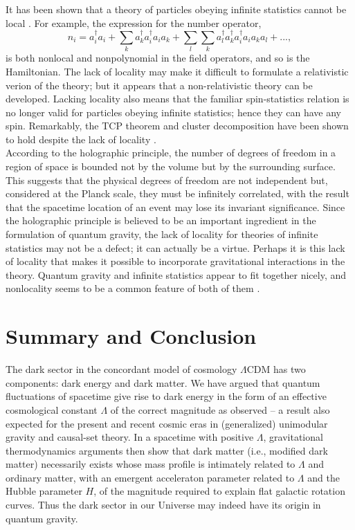\documentclass[a4paper]{jpconf}
\begin{document}
It has been shown that a theory of particles
obeying infinite statistics cannot be local \cite{fredenhagen,
greenberg}.  For example, the expression for the number operator,
\begin{equation}
n_i = a_i^{\dagger} a_i + \sum_k a_k^{\dagger} a_i^{\dagger} a_i a_k 
+ \sum_l \sum_k a_l^{\dagger} a_k^{\dagger} a_i^{\dagger} a_i a_k a_l + ...,
\label{number}
\end{equation}
is both nonlocal and nonpolynomial in the field operators,
and so is the Hamiltonian.  The lack of
locality may make it difficult to formulate a relativistic verion of the
theory; but it appears that a non-relativistic theory can be developed.
Lacking locality also means that the familiar spin-statistics relation is no
longer valid for particles obeying infinite statistics; hence
they can have any spin.  Remarkably, the TCP theorem and cluster
decomposition have been shown to hold despite the lack of locality
\cite{greenberg}.\\

According to the holographic principle, the
number of degrees of freedom in a region of space is bounded not by
the volume but by the surrounding surface.  This suggests that the
physical degrees of freedom are not independent but, considered
at the Planck scale, they must be infinitely correlated, with the result
that the spacetime location of an event may lose its invariant significance.
Since the holographic principle is believed to be
an important ingredient in the formulation of quantum gravity,
the lack of locality for theories of infinite statistics may not be a
defect; it can actually be a virtue.  Perhaps it is this lack of locality 
that makes it possible to incorporate gravitational interactions in
the theory.  Quantum gravity and infinite statistics appear to fit together
nicely, and nonlocality seems to be a common feature of both of them
\cite{plb}.\\


\section{Summary and Conclusion}
The dark sector in the concordant model of cosmology $\Lambda$CDM
has two components: dark energy and dark matter.
We have argued that quantum fluctuations
of spacetime give rise to dark energy in the form of an effective 
cosmological constant $\Lambda$ of the correct magnitude as observed
-- a result also expected for the
present and recent cosmic eras in (generalized) unimodular gravity
and causal-set theory.  In a spacetime with positive
$\Lambda$, gravitational thermodynamics arguments then show that 
dark matter (i.e., modified dark matter)
necessarily exists whose mass profile is intimately
related to $\Lambda$ and ordinary matter, with an emergent 
acceleraton parameter related to $\Lambda$ and the Hubble 
parameter $H$, of the magnitude required to explain
flat galactic rotation curves.  Thus the dark sector in our
Universe may indeed have its origin in quantum gravity.\\
\end{document}
